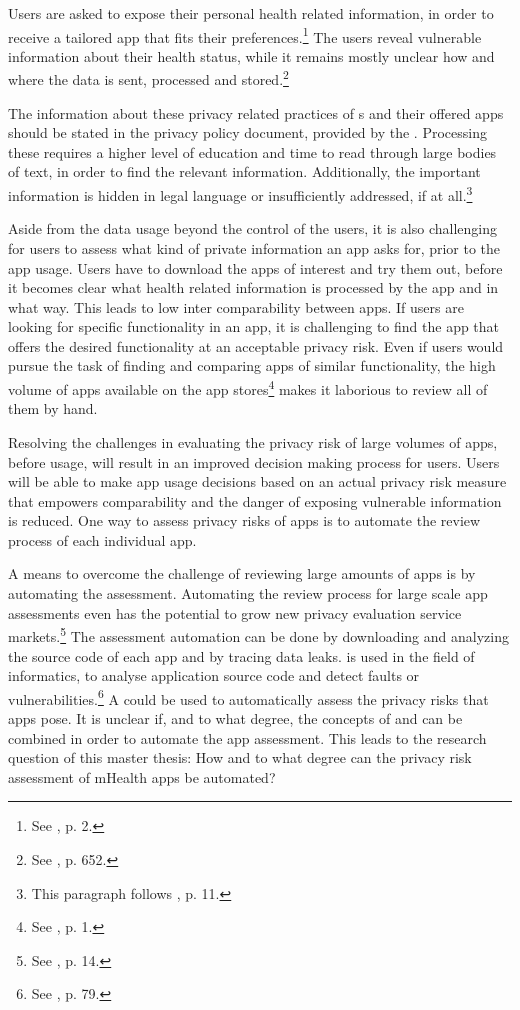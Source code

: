 \documentclass[
	a4paper,
	oneside,
	12pt,
	liststotocnumbered
]{article}
\let\cite\textcite
\begin{document}
Users are asked to expose their personal health related information, in order to receive a tailored app that fits their preferences.\footnote{See \cite{Chen2012}, p. 2.}
The users reveal vulnerable information about their health status, while it remains mostly unclear how and where the data is sent, processed and stored.\footnote{See \cite{He2014}, p. 652.}

The information about these privacy related practices of \ap s and their offered apps should be stated in the privacy policy document, provided by the \ap.
Processing these \pps requires a higher level of education and time to read through large bodies of text, in order to find the relevant information. 
Additionally, the important information is hidden in legal language or insufficiently addressed, if at all.\footnote{This paragraph follows \cite{Dehling2014}, p. 11.}

Aside from the data usage beyond the control of the users, it is also challenging for users to assess what kind of private information an app asks for, prior to the app usage. 
Users have to download the apps of interest and try them out, before it becomes clear what health related information is processed by the app and in what way. 
This leads to low inter comparability between apps. 
If users are looking for specific functionality in an \mH app, it is challenging to find the app that offers the desired functionality at an acceptable privacy risk. 
Even if users would pursue the task of finding and comparing \mH apps of similar functionality, the high volume of apps available on the app stores\footnote{See \cite{Enck2011}, p. 1.} makes it laborious to review all of them by hand.

Resolving the challenges in evaluating the privacy risk of large volumes of \mH apps, before usage, will result in an improved decision making process for users. 
Users will be able to make app usage decisions based on an actual privacy risk measure that empowers comparability and the danger of exposing vulnerable information is reduced. 
One way to assess privacy risks of \mH apps is to automate the review process of each individual app. 

A means to overcome the challenge of reviewing large amounts of \mH apps is by automating the assessment.
Automating the review process for large scale app assessments even has the potential to grow new privacy evaluation service markets.\footnote{See \cite{Enck2011}, p. 14.}
The assessment automation can be done by downloading and analyzing the source code of each app and by tracing data leaks. 
\Sca is used in the field of informatics, to analyse application source code and detect faults or vulnerabilities.\footnote{See \cite{Baca2008}, p. 79.} 
A \sca could be used to automatically assess the privacy risks that \mH apps pose.
It is unclear if, and to what degree, the concepts of \sca and \pra can be combined in order to automate the app assessment.
This leads to the research question of this master thesis: How and to what degree can the privacy risk assessment of mHealth apps be automated?
\end{document}
